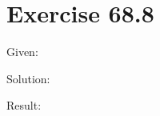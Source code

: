 \documentclass[a4paper, 10pt]{scrartcl}
\begin{document}
\section{Exercise 68.8}

Given:

Solution:

Result:
\end{document}
